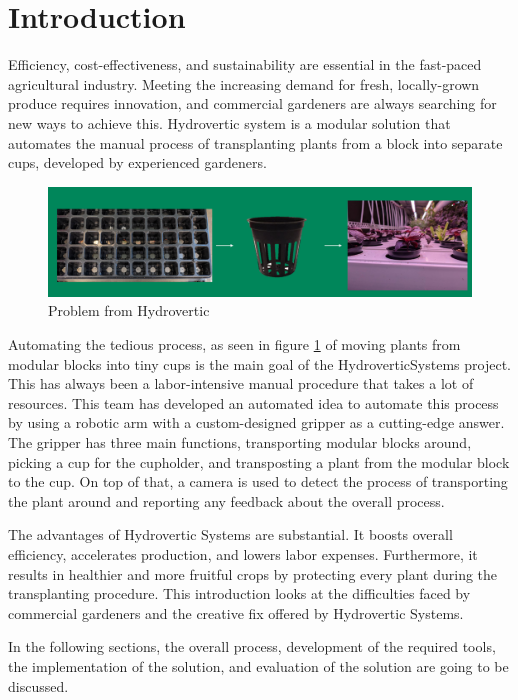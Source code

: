 \documentclass[Setup/main.tex]{subfiles}
\begin{document}
\section{Introduction}

Efficiency, cost-effectiveness, and sustainability are essential in the fast-paced agricultural industry. Meeting the increasing demand for fresh, locally-grown produce requires innovation, and commercial gardeners are always searching for new ways to achieve this. Hydrovertic system is a modular solution that automates the manual process of transplanting plants from a block into separate cups, developed by experienced gardeners.

\begin{figure}[H]
    \centering
    \includegraphics[width=\textwidth]{Tables and Images/problem_hydrovertic.jpg}
    \caption{Problem from Hydrovertic}
    \label{fig:problem}
\end{figure}


Automating the tedious process, as seen in figure \ref{fig:problem} of moving plants from modular blocks into tiny cups is the main goal of the HydroverticSystems project. This has always been a labor-intensive manual procedure that takes a lot of resources. This team has developed an automated idea to automate this process by using a robotic arm with a custom-designed gripper as a cutting-edge answer. The gripper has three main functions, transporting modular blocks around, picking a cup for the cupholder, and transposting a plant from the modular block to the cup. On top of that, a camera is used to detect the process of transporting the plant around and reporting any feedback about the overall process.

The advantages of Hydrovertic Systems are substantial. It boosts overall efficiency, accelerates production, and lowers labor expenses. Furthermore, it results in healthier and more fruitful crops by protecting every plant during the transplanting procedure. This introduction looks at the difficulties faced by commercial gardeners and the creative fix offered by Hydrovertic Systems. 


In the following sections, the overall process, development of the required tools, the implementation of the solution, and evaluation of the solution are going to be discussed. 
\end{document}
